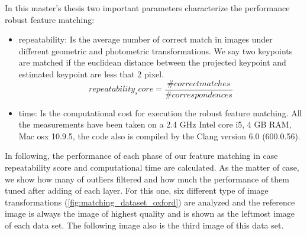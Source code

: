 In this master's thesis two important parameters characterize the performance robust feature matching:
\begin{itemize}
  \item repeatability: Is the average number of correct match in images under different geometric and photometric transformations. We say two keypoints are matched if the euclidean distance between the projected keypoint and estimated keypoint are less that 2 pixel.\\
  $$repeatability_score = \frac{\# correct matches}{\# correspondences}$$
  \item time: Is the computational cost for execution the robust feature matching. All the measurements have been taken on a 2.4 GHz Intel core i5, 4 GB RAM, Mac osx 10.9.5, the code also is compiled by the Clang version 6.0 (600.0.56).
\end{itemize}

In following, the performance of each phase of our feature matching in case repeatability score and computational time are calculated. As the matter of case, we show how many of outliers filtered and how much the performance of them tuned after adding of each layer. For this one, six different type of image transformations (\autoref{fig:matching_dataset_oxford}) are analyzed and the reference image is always the image of highest quality and is shown as the leftmost image of each data set. The following image also is the third image of this data set.

